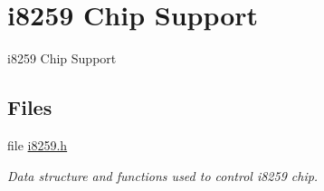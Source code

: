 \hypertarget{group__mips__i8259__irq}{}\section{i8259 Chip Support}
\label{group__mips__i8259__irq}


i8259 Chip Support  


\subsection*{Files}
\begin{DoxyCompactItemize}
\item 
file \mbox{\hyperlink{i8259_8h}{i8259.\+h}}
\begin{DoxyCompactList}\small\item\em Data structure and functions used to control i8259 chip. \end{DoxyCompactList}\end{DoxyCompactItemize}
